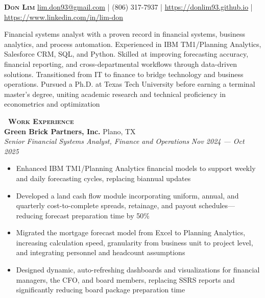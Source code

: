 \documentclass[a4paper,11pt]{article}
\newcommand{\header} [1] {
    \vspace{0.5mm}
    {\textsc{\textbf{\Large{\xrfill[0.5ex]{0.5pt}~#1~\xrfill[0.5ex]{0.5pt}}}}} %
}
\begin{document}
\vspace*{-0.45in}
\fontsize{10.5}{11.5}\selectfont

\begin{raggedright}
    {\Huge\textbf\textsc{{{Don Lim}}}} \hfill
    \href{mailto:lim.don93@gmail.com}{lim.don93@gmail.com} | (806) 317-7937 | \href{https://donlim93.github.io/}{https://donlim93.github.io} | \href{https://www.linkedin.com/in/lim-don/}{https://www.linkedin.com/in/lim-don} \\ \vspace{2mm}
\end{raggedright}

Financial systems analyst with a proven record in financial systems, business analytics, and process automation. Experienced in IBM TM1/Planning Analytics, Salesforce CRM, SQL, and Python. Skilled at improving forecasting accuracy, financial reporting, and cross-departmental workflows through data-driven solutions. Transitioned from IT to finance to bridge technology and business operations. Pursued a Ph.D. at Texas Tech University before earning a terminal master’s degree, uniting academic research and technical proficiency in econometrics and optimization \\

\vspace{0.5mm}
\header{Work Experience} \\
\vspace{0.5mm}
\textbf{Green Brick Partners, Inc.} \hfill Plano, TX \\
\textit{Senior Financial Systems Analyst, Finance and Operations} \hfill \textit{Nov 2024 --- Oct 2025} \\
\begin{itemize}
    \item Enhanced IBM TM1/Planning Analytics financial models to support weekly and daily forecasting cycles, replacing biannual updates
    \item Developed a land cash flow module incorporating uniform, annual, and quarterly cost-to-complete spreads, retainage, and payout schedules—reducing forecast preparation time by 50\%
    \item Migrated the mortgage forecast model from Excel to Planning Analytics, increasing calculation speed, granularity from business unit to project level, and integrating personnel and headcount assumptions
    \item Designed dynamic, auto-refreshing dashboards and visualizations for financial managers, the CFO, and board members, replacing SSRS reports and significantly reducing board package preparation time
\end{itemize}
\vspace{0.5mm}
\end{document}
